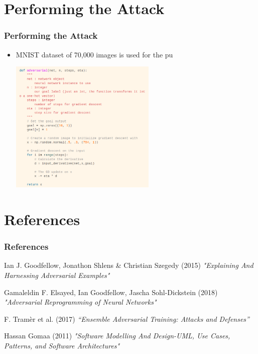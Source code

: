 \documentclass[t,10pt,pdftex]{beamer}
\begin{document}
\section{Performing the Attack}
\begin{frame}
\frametitle{Performing the Attack}
\begin{itemize}
    \item MNIST dataset of 70,000 images is used for the pu
\end{itemize}
\includegraphics[width=3.25in,height=2.5in]{code.png}

\end{frame}



\section{References}
\begin{frame}
\frametitle{References}
\footnotesize{
\begin{thebibliography}{99}

Ian J. Goodfellow, Jonathon Shlens & Christian Szegedy (2015)
\newblock \emph{"Explaining And Harnessing Adversarial Examples"}

Gamaleldin F. Elsayed, Ian Goodfellow, Jascha Sohl-Dickstein  (2018)
\newblock \emph{"Adversarial Reprogramming of Neural Networks"}

 F. Tramèr et al. (2017)
\newblock \emph{“Ensemble Adversarial Training: Attacks and
Defenses” }

Hassan Gomaa (2011)
\newblock \emph{"Software Modelling And Design-UML, Use Cases, Patterns, and
Software Architectures"}
\end{thebibliography}
}


\end{frame}


\end{document}
